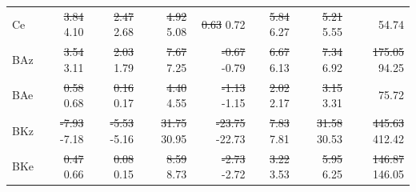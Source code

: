 \documentclass[pdflatex,sn-chicago]{sn-jnl}%
\makeatletter
\theoremstyle{plain}
\theoremstyle{definition}
\theoremstyle{remark}
\theoremstyle{definition}
\providecommand{\DIFaddtex}[1]{{\protect\color{blue}#1}} %
\providecommand{\DIFdeltex}[1]{{\protect\color{red}\sout{#1}}} %
\providecommand{\DIFaddFL}[1]{\DIFadd{#1}} %
\providecommand{\DIFdelFL}[1]{\DIFdel{#1}} %
\providecommand{\DIFaddbeginFL}{} %
\providecommand{\DIFaddendFL}{} %
\providecommand{\DIFdelbeginFL}{} %
\providecommand{\DIFdelendFL}{} %
\providecommand{\DIFadd}[1]{\texorpdfstring{\DIFaddtex{#1}}{#1}} %
\providecommand{\DIFdel}[1]{\texorpdfstring{\DIFdeltex{#1}}{}} %
\let\sout@orig\sout %
\renewcommand{\sout}[1]{\ifmmode\text{\sout@orig{\ensuremath{#1}}}\else\sout@orig{#1}\fi} %
\makeatother
\begin{document}
\begin{table}[!htbp]
\begin{tabular}{lrrrrrrr}
Ce & \DIFdelbeginFL \DIFdelFL{3.84 }\DIFdelendFL \DIFaddbeginFL \DIFaddFL{4.10 }\DIFaddendFL & \DIFdelbeginFL \DIFdelFL{2.47 }\DIFdelendFL \DIFaddbeginFL \DIFaddFL{2.68 }\DIFaddendFL & \DIFdelbeginFL \DIFdelFL{4.92 }\DIFdelendFL \DIFaddbeginFL \DIFaddFL{5.08 }\DIFaddendFL & \DIFdelbeginFL \DIFdelFL{0.63 }\DIFdelendFL \DIFaddbeginFL \DIFaddFL{0.72 }\DIFaddendFL & \DIFdelbeginFL \DIFdelFL{5.84 }\DIFdelendFL \DIFaddbeginFL \DIFaddFL{6.27 }\DIFaddendFL & \DIFdelbeginFL \DIFdelFL{5.21 }\DIFdelendFL \DIFaddbeginFL \DIFaddFL{5.55 }\DIFaddendFL & 54.74 \\
BAz & \DIFdelbeginFL \DIFdelFL{3.54 }\DIFdelendFL \DIFaddbeginFL \DIFaddFL{3.11 }\DIFaddendFL & \DIFdelbeginFL \DIFdelFL{2.03 }\DIFdelendFL \DIFaddbeginFL \DIFaddFL{1.79 }\DIFaddendFL & \DIFdelbeginFL \DIFdelFL{7.67 }\DIFdelendFL \DIFaddbeginFL \DIFaddFL{7.25 }\DIFaddendFL & \DIFdelbeginFL \DIFdelFL{-0.67 }\DIFdelendFL \DIFaddbeginFL \DIFaddFL{-0.79 }\DIFaddendFL & \DIFdelbeginFL \DIFdelFL{6.67 }\DIFdelendFL \DIFaddbeginFL \DIFaddFL{6.13 }\DIFaddendFL & \DIFdelbeginFL \DIFdelFL{7.34 }\DIFdelendFL \DIFaddbeginFL \DIFaddFL{6.92 }\DIFaddendFL & \DIFdelbeginFL \DIFdelFL{175.05 }\DIFdelendFL \DIFaddbeginFL \DIFaddFL{94.25 }\DIFaddendFL \\
BAe & \DIFdelbeginFL \DIFdelFL{0.58 }\DIFdelendFL \DIFaddbeginFL \DIFaddFL{0.68 }\DIFaddendFL & \DIFdelbeginFL \DIFdelFL{0.16 }\DIFdelendFL \DIFaddbeginFL \DIFaddFL{0.17 }\DIFaddendFL & \DIFdelbeginFL \DIFdelFL{4.40 }\DIFdelendFL \DIFaddbeginFL \DIFaddFL{4.55 }\DIFaddendFL & \DIFdelbeginFL \DIFdelFL{-1.13 }\DIFdelendFL \DIFaddbeginFL \DIFaddFL{-1.15 }\DIFaddendFL & \DIFdelbeginFL \DIFdelFL{2.02 }\DIFdelendFL \DIFaddbeginFL \DIFaddFL{2.17 }\DIFaddendFL & \DIFdelbeginFL \DIFdelFL{3.15 }\DIFdelendFL \DIFaddbeginFL \DIFaddFL{3.31 }\DIFaddendFL & 75.72 \\
BKz & \DIFdelbeginFL \DIFdelFL{-7.93 }\DIFdelendFL \DIFaddbeginFL \DIFaddFL{-7.18 }\DIFaddendFL & \DIFdelbeginFL \DIFdelFL{-5.53 }\DIFdelendFL \DIFaddbeginFL \DIFaddFL{-5.16 }\DIFaddendFL & \DIFdelbeginFL \DIFdelFL{31.75 }\DIFdelendFL \DIFaddbeginFL \DIFaddFL{30.95 }\DIFaddendFL & \DIFdelbeginFL \DIFdelFL{-23.75 }\DIFdelendFL \DIFaddbeginFL \DIFaddFL{-22.73 }\DIFaddendFL & \DIFdelbeginFL \DIFdelFL{7.83 }\DIFdelendFL \DIFaddbeginFL \DIFaddFL{7.81 }\DIFaddendFL & \DIFdelbeginFL \DIFdelFL{31.58 }\DIFdelendFL \DIFaddbeginFL \DIFaddFL{30.53 }\DIFaddendFL & \DIFdelbeginFL \DIFdelFL{445.63 }\DIFdelendFL \DIFaddbeginFL \DIFaddFL{412.42 }\DIFaddendFL \\
BKe & \DIFdelbeginFL \DIFdelFL{0.47 }\DIFdelendFL \DIFaddbeginFL \DIFaddFL{0.66 }\DIFaddendFL & \DIFdelbeginFL \DIFdelFL{0.08 }\DIFdelendFL \DIFaddbeginFL \DIFaddFL{0.15 }\DIFaddendFL & \DIFdelbeginFL \DIFdelFL{8.59 }\DIFdelendFL \DIFaddbeginFL \DIFaddFL{8.73 }\DIFaddendFL & \DIFdelbeginFL \DIFdelFL{-2.73 }\DIFdelendFL \DIFaddbeginFL \DIFaddFL{-2.72 }\DIFaddendFL & \DIFdelbeginFL \DIFdelFL{3.22 }\DIFdelendFL \DIFaddbeginFL \DIFaddFL{3.53 }\DIFaddendFL & \DIFdelbeginFL \DIFdelFL{5.95 }\DIFdelendFL \DIFaddbeginFL \DIFaddFL{6.25 }\DIFaddendFL & \DIFdelbeginFL \DIFdelFL{146.87 }\DIFdelendFL \DIFaddbeginFL \DIFaddFL{146.05 }\DIFaddendFL \\

\end{tabular}
\end{table}
\end{document}
